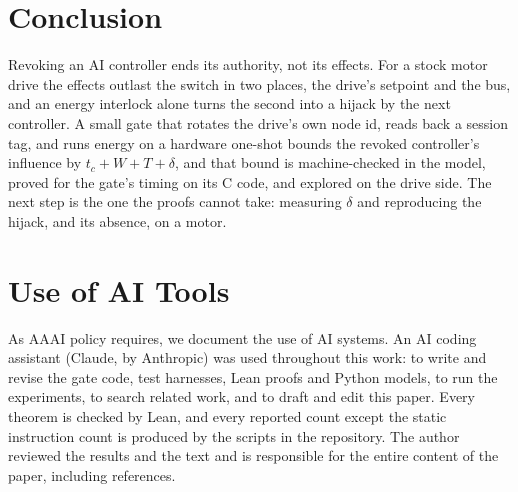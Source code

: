 \documentclass[letterpaper]{article} %
\begin{document}
\section{Conclusion}

Revoking an AI controller ends its authority, not its effects. For a stock motor drive the effects
outlast the switch in two places, the drive's setpoint and the bus, and an energy interlock alone
turns the second into a hijack by the next controller. A small gate that rotates the drive's own
node id, reads back a session tag, and runs energy on a hardware one-shot bounds the revoked
controller's influence by $t_c + W + T + \delta$, and that bound is machine-checked in the model,
proved for the gate's timing on its C code, and explored on the drive side. The next step is the one the proofs cannot take: measuring $\delta$ and
reproducing the hijack, and its absence, on a motor.

\section*{Use of AI Tools}
As AAAI policy requires, we document the use of AI systems. An AI coding assistant (Claude, by
Anthropic) was used throughout this work: to write and revise the gate code, test harnesses, Lean
proofs and Python models, to run the experiments, to search related work, and to draft and edit
this paper. Every theorem is checked by Lean, and every reported count except the static
instruction count is produced by the scripts in the repository. The author reviewed the results and the text and is responsible for the entire
content of the paper, including references.


\end{document}
